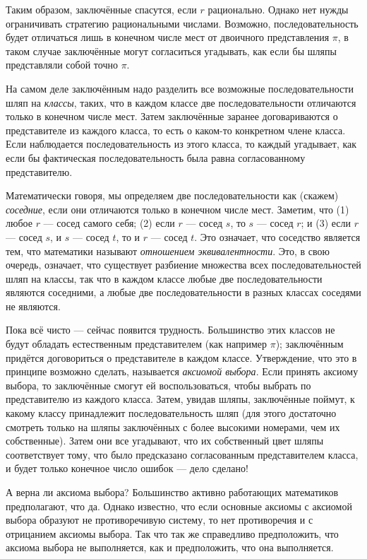 Таким образом, заключённые спасутся, если $r$ рационально.
Однако нет нужды ограничивать стратегию рациональными числами.
Возможно, последовательность будет отличаться лишь в конечном числе мест от двоичного представления $\pi$, в таком случае заключённые могут согласиться угадывать, как если бы шляпы представляли собой точно $\pi$.

На самом деле заключённым надо разделить все возможные последовательности шляп на \emph{классы}, таких, что в каждом классе две последовательности отличаются только в конечном числе мест.
Затем заключённые заранее договариваются о представителе из каждого класса, то есть о каком-то конкретном члене класса.
Если наблюдается последовательность из этого класса, то каждый угадывает, как если бы фактическая последовательность была равна согласованному представителю.

Математически говоря, мы определяем две последовательности как (скажем) \emph{соседние}, если они отличаются только в конечном числе мест.
Заметим, что
(1) любое $r$ --- сосед самого себя;
(2) если $r$ --- сосед $s$, то $s$ --- сосед $r$; и
(3) если $r$ --- сосед $s$, и $s$ --- сосед $t$, то и $r$ --- сосед $t$.
Это означает, что соседство является тем, что математики называют \emph{отношением эквивалентности}.
Это, в свою очередь, означает, что существует разбиение множества всех последовательностей шляп на классы, так что в каждом классе любые две последовательности являются соседними, а любые две последовательности в разных классах соседями не являются.

Пока всё чисто --- сейчас появится трудность.
Большинство этих классов не будут обладать естественным представителем (как например $\pi$);
заключённым придётся договориться о представителе в каждом классе.
Утверждение, что это в принципе возможно сделать, называется \emph{аксиомой выбора}.
Если принять аксиому выбора, то заключённые смогут ей воспользоваться, чтобы выбрать по представителю из каждого класса.
Затем, увидав шляпы, заключённые поймут, к какому классу принадлежит последовательность шляп (для этого достаточно смотреть только на шляпы заключённых с более высокими номерами, чем их собственные).
Затем они все угадывают, что их собственный цвет шляпы соответствует тому, что было предсказано согласованным представителем класса, и будет только конечное число ошибок --- дело сделано!

А верна ли аксиома выбора?
Большинство активно работающих математиков предполагают, что да.
Однако известно, что если основные аксиомы с аксиомой выбора образуют не противоречивую систему, то нет противоречия и с отрицанием аксиомы выбора.
Так что так же справедливо предположить, что аксиома выбора не выполняется, как и предположить, что она выполняется.

